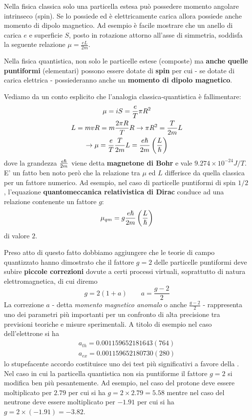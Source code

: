 Nella fisica classica solo una particella estesa può possedere momento angolare intrinseco (spin).
Se lo possiede ed è elettricamente carica allora possiede anche momento di dipolo magnetico.
Ad esempio è facile mostrare che un anello di carica $e$ e superficie $S$, posto in rotazione attorno all'asse di
simmetria, soddisfa la seguente relazione $\mu = \frac{eL}{2m}$.

Nella fisica quantistica, non solo le particelle estese (composte) ma \textbf{anche quelle puntiformi}  (elementari)
possono essere dotate di \textbf{spin} per cui - se dotate di carica elettrica - possiederanno anche un \textbf{momento di dipolo magnetico}.

Vediamo da un conto esplicito che l'analogia classica-quantistica è fallimentare:
\begin{gather*}
    \mu = i S = \frac{e}{T}\pi R^2 \\
    L = mvR = m \frac{2 \pi R}{T}R \rightarrow  \pi R^2 = \frac{T}{2m}L\\
     \rightarrow \mu = \frac{e}{T}\frac{T}{2m}L = \frac{e \hslash}{2m}\left( \frac{L}{\hslash}\right)
\end{gather*}
dove la grandezza $\frac{e \hslash}{2m}$ viene detta \textbf{magnetone di Bohr} e vale $9.274\times 10^{-24}J/T$.
E' un fatto ben noto però che la relazione tra $\mu$ ed $L$ differisce da quella classica per un fattore numerico.
Ad esempio, nel caso di particelle puntiformi di spin $1/2$, l'equazione \textbf{quantomeccanica relativistica di Dirac}
conduce ad una relazione contenente un fattore $g$:
\begin{equation}
    \mu_{qm} = g \frac{e \hp}{2m}\left( \frac{L}{\hp}\right)
    \label{eq:qm-magnetic-dipole-moment}
\end{equation}
di valore $2$.

Preso atto di questo fatto dobbiamo aggiungere che le teorie di campo quantizzato hanno dimostrato che il fattore $g=2$
delle particelle puntiformi deve subire \textbf{piccole correzioni} dovute a certi processi virtuali, soprattutto di natura elettromagnetica, di cui diremo
\[
g = 2(1+a) \qquad a = \frac{g -2}{2}
\]
La correzione $a$ - detta \emph{momento magnetico anomalo} o anche $\frac{g -2}{2}$ - rappresenta uno dei parametri più importanti per un confronto di alta precisione tra previsioni teoriche e misure sperimentali.
A titolo di esempio nel caso dell'elettrone si ha
\begin{gather*}
    a_{th} = 0.001 159 652 181 643 (764)\\
    a_{ex} = 0.001 159 652 180 730 (280)
\end{gather*}
lo stupefacente accordo costituisce uno dei test più significativi a favore della .
Nel caso in cui la particella quantistica non sia puntiforme il fattore $g=2$ si modifica ben più pesantemente.
Ad esempio, nel caso del protone deve essere moltiplicato per $2.79$ per cui si ha $g=2 \times 2.79=5.58$ mentre nel caso
del neutrone deve essere moltiplicato per $-1.91$ per cui si ha $g=2 \times(-1.91) = -3.82$.

